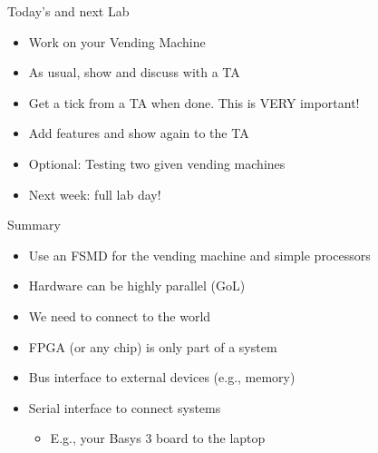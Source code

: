 \begin{frame}[fragile]{Today's  and next Lab}
\begin{itemize}
\item Work on your Vending Machine
\item As usual, show and discuss with a TA
\item Get a tick from a TA when done. This is VERY important!
\item Add features and show again to the TA
\item Optional: Testing two given vending machines
\item Next week: full lab day!
\end{itemize}
\end{frame}



\begin{frame}[fragile]{Summary}
\begin{itemize}
\item Use an FSMD for the vending machine and simple processors
\item Hardware can be highly parallel (GoL)
\item We need to connect to the world
\item FPGA (or any chip) is only part of a system
\item Bus interface to external devices (e.g., memory)
\item Serial interface to connect systems
\begin{itemize}
\item E.g., your Basys 3 board to the laptop
\end{itemize}
\end{itemize}
\end{frame}





